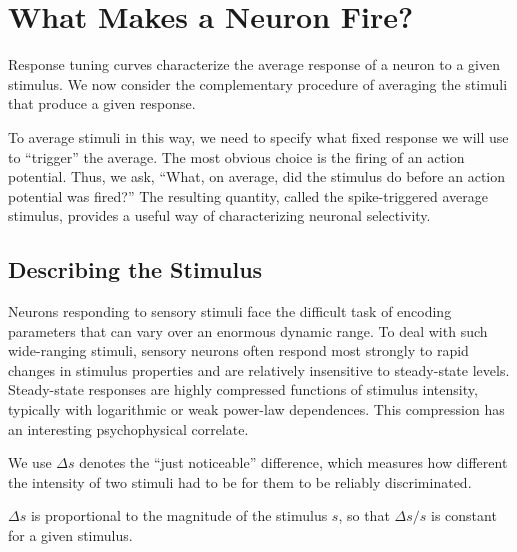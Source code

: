 \section{What Makes a Neuron Fire?}
\label{sec:what-makes-a-neuron-fire}

\begin{rem}
  Response tuning curves characterize the average response of a neuron to a given stimulus. We now consider the complementary procedure of averaging the stimuli that produce a given response.  
\end{rem}
\begin{rem}
  To average stimuli in this way, we need to specify what fixed response we will use to “trigger” the average. The most obvious choice is the firing of an action potential. Thus, we ask, “What, on average, did the stimulus do before an action potential was fired?” The resulting quantity, called the spike-triggered average stimulus, provides a useful way of characterizing neuronal selectivity.
\end{rem}

\subsection{Describing the Stimulus}
\begin{rem}
  \label{exm:Steady-state responses}
  Neurons responding to sensory stimuli face the difficult task of encoding parameters that can vary over an enormous dynamic range. 
  To deal with such wide-ranging stimuli, sensory neurons often respond most strongly to rapid changes in stimulus properties and are relatively insensitive to steady-state levels. Steady-state responses are highly compressed functions of stimulus intensity, typically with logarithmic or weak power-law dependences. This compression has an interesting psychophysical correlate.
\end{rem}

\begin{ntn}
  \label{defn:noticeable difference}
  We use $\Delta{s}$ denotes the “just noticeable” difference, which measures how different the intensity of two stimuli had to be for them to be reliably discriminated.  
\end{ntn}
\begin{prin}
  \label{prin:Weber's law}
  $\Delta{s}$ is proportional to the magnitude of the stimulus $s$, so that $\Delta{s}/s$ is constant for a given stimulus.
\end{prin}

